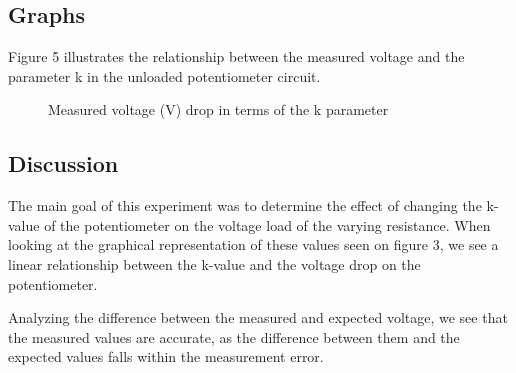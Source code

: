 \documentclass[a4paper]{article}
\newcommand{\unit}[1]{~\mathrm{#1}}
\begin{document}
\subsection{Graphs}
Figure 5 illustrates the relationship between the measured voltage and the parameter 
k in the unloaded potentiometer circuit.
\begin{figure}[!ht]
    \centering
    \caption{Measured voltage (V) drop in terms of the k parameter}
    \label{fig:3}
\end{figure}

\subsection{Discussion}
The main goal of this experiment was to determine the effect of changing the
k-value of the potentiometer on the voltage load of the varying resistance. When
looking at the graphical representation of these values seen on figure 3, we see
a linear relationship between the k-value and the voltage drop on the
potentiometer.

Analyzing the difference between the measured and expected
voltage, we see that the measured values are accurate, as the difference between
them and the expected values falls within the measurement error. 
\newpage
\end{document}
